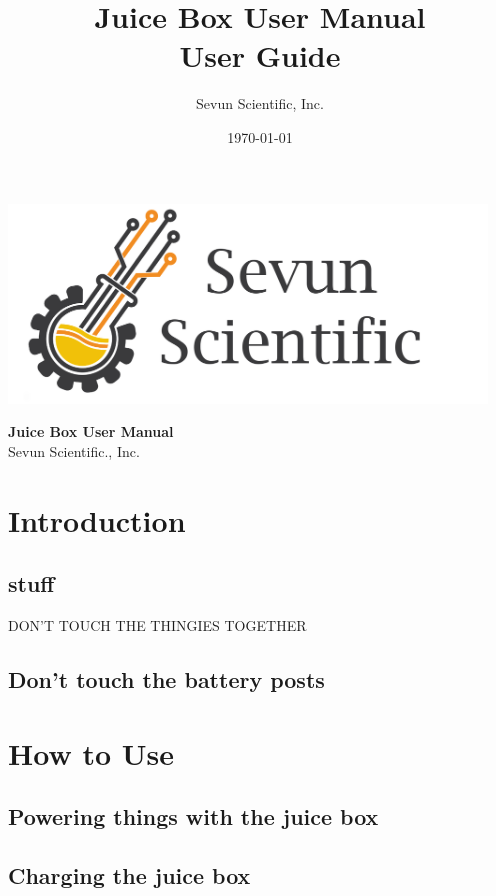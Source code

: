 \documentclass[letterpaper]{report}
\begin{document}
\title{Juice Box User Manual\\User Guide}
\author{Sevun Scientific, Inc.}
\date{\today}
\begin{titlingpage} %
	\centering
	\includegraphics[width=5in]{ssi_logo.png}
	\vspace{2cm} %
\begin{flushleft}
	\begin{Huge}
		\textbf{Juice Box User Manual}\\
		\vspace{5mm}
		Sevun Scientific., Inc.
	\end{Huge}
\end{flushleft}

\vfill
\Large \thedate \par

\end{titlingpage} 

\newpage
\tableofcontents

\newpage
\section{Introduction}
	\subsection{stuff}
DON'T TOUCH THE THINGIES TOGETHER
	\subsection{Don’t touch the battery posts}
\section{How to Use}
	\subsection{Powering things with the juice box}
	\subsection{Charging the juice box}
\end{document}
